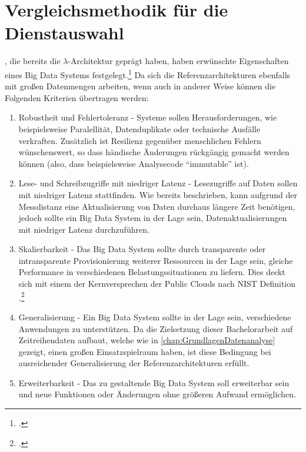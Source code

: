 \section{Vergleichsmethodik für die Dienstauswahl}\label{chap:vergleichsmethodik}

\citeauthor{Marz.2015}, die bereits die $\lambda$-Architektur geprägt haben, haben erwünschte Eigenschaften eines Big Data Systems festgelegt.\footcite[Vgl. auch im Folgenden][7\psqq]{Marz.2015} Da sich die Referenzarchitekturen ebenfalls mit großen Datenmengen arbeiten, wenn auch in anderer Weise können die Folgenden Kriterien übertragen werden:
\begin{enumerate}
\item Robustheit und Fehlertoleranz  - 
Systeme sollen Herausforderungen, wie beispielsweise Paralellität, Datenduplikate oder technische Ausfälle verkraften. Zusätzlich ist Resilienz gegenüber menschlichen Fehlern wünschenswert, so dass händische Änderungen rückgängig gemacht werden können (also, dass beispielsweise Analysecode \enquote{immutable} ist).

\item Lese- und Schreibzugriffe mit niedriger Latenz  - 
Lesezugriffe auf Daten sollen mit niedriger Latenz stattfinden. Wie bereits beschrieben, kann aufgrund der Messdistanz eine Aktualisierung von Daten durchaus längere Zeit benötigen, jedoch sollte ein Big Data System in der Lage sein, Datenaktualisierungen mit niedriger Latenz durchzuführen.

\item Skalierbarkeit  - 
Das Big Data System sollte durch transparente oder intransparente Provisionierung weiterer Ressourcen in der Lage sein, gleiche Performance in verschiedenen Belastungssituationen zu liefern. Dies deckt sich mit einem der Kernversprechen der Public Clouds nach NIST Definition .\footcite[Vgl.][2]{Mell.2011}

\item Generalisierung  - 
Ein Big Data System sollte in der Lage sein, verschiedene Anwendungen zu unterstützen. Da die Zielsetzung dieser Bachelorarbeit auf Zeitreihendaten aufbaut, welche wie in \autoref{chap:GrundlagenDatenanalyse} gezeigt, einen großen Einsatzspielraum haben, ist diese Bedingung bei ausreichender Generalisierung der Referenzarchitekturen erfüllt.

\item Erweiterbarkeit  - 
Das zu gestaltende Big Data System soll erweiterbar sein und neue Funktionen oder Änderungen ohne größeren Aufwand ermöglichen.


\end{enumerate}
